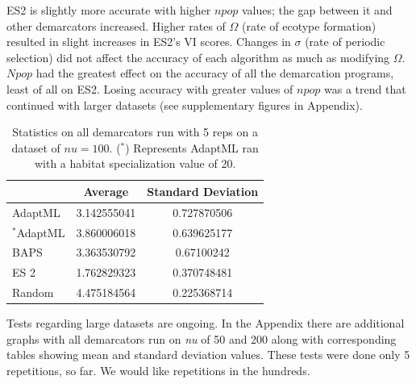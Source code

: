 ES2 is slightly more accurate with higher $npop$ values; the gap between it and other demarcators increased.
Higher rates of $\Omega$ (rate of ecotype formation) resulted in slight increases in ES2's VI scores.
Changes in $\sigma$ (rate of periodic selection) did not affect the accuracy of each algorithm as much as modifying $\Omega$.
$Npop$ had the greatest effect on the accuracy of all the demarcation programs, least of all on ES2.
Losing accuracy with greater values of $npop$ was a trend that continued with larger datasets (see supplementary figures in Appendix).

\begin{table}[h!]
    \begin{tabular}{l|cc}
    ~                    & Average     & Standard Deviation \\ \hline
    AdaptML              & 3.142555041 & 0.727870506        \\
    $^\ast$AdaptML              & 3.860006018 & 0.639625177        \\
    BAPS                 & 3.363530792 & 0.67100242         \\
    ES 2 & 1.762829323 & 0.370748481        \\
    Random               & 4.475184564 & 0.225368714        \\
    \end{tabular}
    \caption[Statistics on all demarcators on $nu=100$.]{Statistics on all demarcators run with 5 reps on a dataset of $nu=100$. ($^\ast$) Represents AdaptML ran with a habitat specialization value of 20. }
        \label{tab:100Allmean}
\end{table}

Tests regarding large datasets are ongoing.
In the Appendix there are additional graphs with all demarcators run on \emph{nu} of 50 and 200 along with corresponding tables showing mean and standard deviation values.
These tests were done only 5 repetitions, so far.
We would like repetitions in the hundreds.

